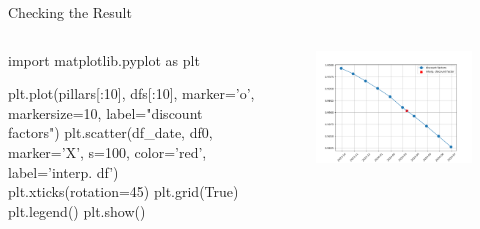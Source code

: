 \documentclass{beamer}
\begin{document}
\begin{frame}[fragile]{Checking the Result}
\begin{columns}
\begin{ipython}
import matplotlib.pyplot as plt

plt.plot(pillars[:10], dfs[:10], 
         marker='o', markersize=10, 
         label="discount factors")
plt.scatter(df_date, df0, marker='X', 
            s=100, color='red', 
            label='interp. df')
plt.xticks(rotation=45)
plt.grid(True)
plt.legend()
plt.show()
\end{ipython}
    \begin{figure}[h]	
        \begin{center}
        \includegraphics[width=1.\linewidth]{discount_interp}
        \end{center}
    \end{figure}
\end{columns}
\end{frame}
\end{document}
